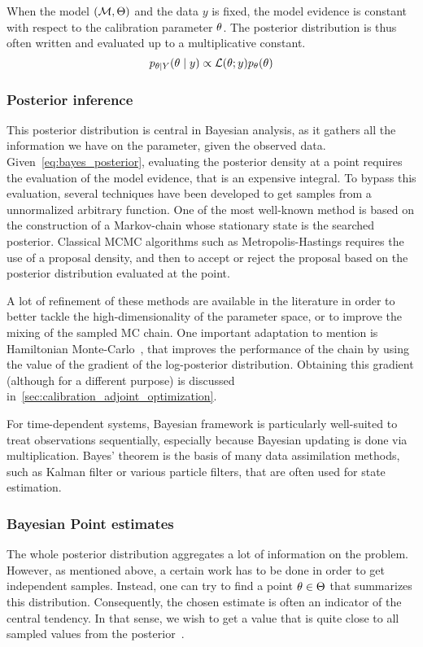 \documentclass[../../Main_ManuscritThese.tex]{subfiles}
\begin{document}
When the model $(\mathcal{M},\Theta)$ and the data $y$ is fixed, the
model evidence is constant with respect to the calibration parameter
$\theta$. The posterior distribution is thus often written and evaluated
up to a multiplicative constant.
\begin{equation}
p_{\theta \mid Y}(\theta \mid y) \propto \mathcal{L}(\theta;y)p_{\theta}(\theta)
\end{equation}



\subsubsection{Posterior inference}
\label{sec:posterior_inference}
This posterior distribution is central in Bayesian analysis, as it
gathers all the information we have on the parameter, given the
observed data. Given~\cref{eq:bayes_posterior}, evaluating the
posterior density at a point requires the evaluation of the model
evidence, that is an expensive integral. To bypass this evaluation,
several techniques have been developed to get samples from a
unnormalized arbitrary function. One of the most well-known method is
based on the construction of a Markov-chain whose stationary state is
the searched posterior. Classical MCMC algorithms such as
Metropolis-Hastings requires the use of a proposal density, and then
to accept or reject the proposal based on the posterior distribution
evaluated at the point.

A lot of refinement of these methods are available in the literature
in order to better tackle the high-dimensionality of the parameter
space, or to improve the mixing of the sampled MC chain. One important
adaptation to mention is Hamiltonian
Monte-Carlo~\citep{hanson_markov_2001,betancourt_conceptual_2017}, that
improves the performance of the chain by using the value of the
gradient of the log-posterior distribution. Obtaining this gradient
(although for a different purpose) is discussed
in~\cref{sec:calibration_adjoint_optimization}.


For time-dependent systems, Bayesian framework is particularly
well-suited to treat observations sequentially, especially because
Bayesian updating is done via multiplication. Bayes' theorem is the
basis of many data assimilation methods, such as Kalman filter or
various particle filters, that are often used for state estimation.

\subsubsection{Bayesian Point estimates}
\label{sec:bayes_point_estimates}
The whole posterior distribution aggregates a lot of information on
the problem. However, as mentioned above, a certain work has to be
done in order to get independent samples. Instead, one can try to find
a point $\theta \in \Theta$ that summarizes %
this distribution. Consequently, the chosen estimate is often an
indicator of the central tendency. In that sense, we wish to get a
value that is quite close to all sampled values from the
posterior~\citep{lehmann_theory_2006}.
\end{document}
